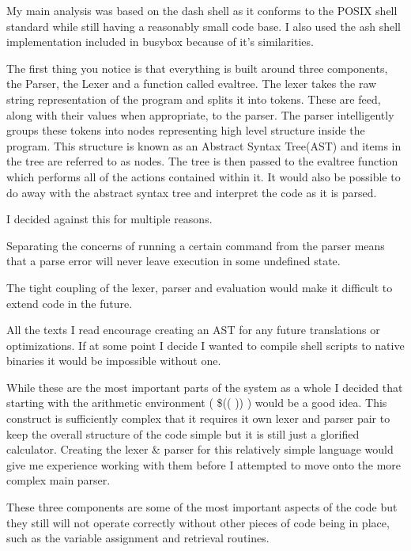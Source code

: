My main analysis was based on the dash shell\cite{DASH} as it conforms to the POSIX shell standard\cite{POSIX-SHELL-STANDARD} while still having a reasonably small code base.
I also used the ash shell implementation included in busybox\cite{BUSYBOX} because of it's similarities.

The first thing you notice is that everything is built around three components, the Parser, the Lexer and a function called evaltree.
The lexer takes the raw string representation of the program and splits it into tokens.
These are feed, along with their values when appropriate, to the parser.
The parser intelligently groups these tokens into nodes representing high level structure inside the program.
This structure is known as an Abstract Syntax Tree(AST) and items in the tree are referred to as nodes.
The tree is then passed to the evaltree function which performs all of the actions contained within it.
It would also be possible to do away with the abstract syntax tree and interpret the code as it is parsed.

I decided against this for multiple reasons.
\begin{enumerate*}
	\item Separating the concerns of running a certain command from the parser means that a parse error will never leave execution in some undefined state.
	\item The tight coupling of the lexer, parser and evaluation would make it difficult to extend code in the future.
	\item All the texts I read encourage creating an AST for any future translations or optimizations. If at some point I decide I wanted to compile shell scripts to native binaries it would be impossible without one.
\end{enumerate*}

While these are the most important parts of the system as a whole I decided that starting with the arithmetic environment ( \$(( )) ) would be a good idea.
This construct is sufficiently complex that it requires it own lexer and parser pair to keep the overall structure of the code simple but it is still just a glorified calculator.
Creating the lexer \& parser for this relatively simple language would give me experience working with them before I attempted to move onto the more complex main parser.


These three components are some of the most important aspects of the code but they still will not operate correctly without other pieces of code being in place, such as the variable assignment and retrieval routines.

